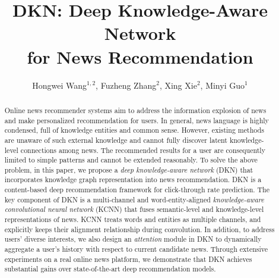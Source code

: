 \documentclass[sigconf]{acmart}
\begin{document}
\title[DKN: Deep Knowledge-Aware Network for News Recommendation]{DKN: Deep Knowledge-Aware Network\\for News Recommendation}


\author{Hongwei Wang$^{1,2}$, Fuzheng Zhang$^2$, Xing Xie$^2$, Minyi Guo$^1$}


\renewcommand{\shortauthors}{H. Wang et al.}


\begin{abstract}
	Online news recommender systems aim to address the information explosion of news and make personalized recommendation for users.
	In general, news language is highly condensed, full of knowledge entities and common sense.
	However, existing methods are unaware of such external knowledge and cannot fully discover latent knowledge-level connections among news.
	The recommended results for a user are consequently limited to simple patterns and cannot be extended reasonably.
To solve the above problem, in this paper, we propose a \textit{deep knowledge-aware network} (DKN) that incorporates knowledge graph representation into news recommendation.
	DKN is a content-based deep recommendation framework for click-through rate prediction.
	The key component of DKN is a multi-channel and word-entity-aligned \textit{knowledge-aware convolutional neural network} (KCNN) that fuses semantic-level and knowledge-level representations of news.
	KCNN treats words and entities as multiple channels, and explicitly keeps their alignment relationship during convolution.
	In addition, to address users' diverse interests, we also design an \textit{attention} module in DKN to dynamically aggregate a user's history with respect to current candidate news.
	Through extensive experiments on a real online news platform, we demonstrate that DKN achieves substantial gains over state-of-the-art deep recommendation models.
\end{abstract}



\maketitle
\end{document}
